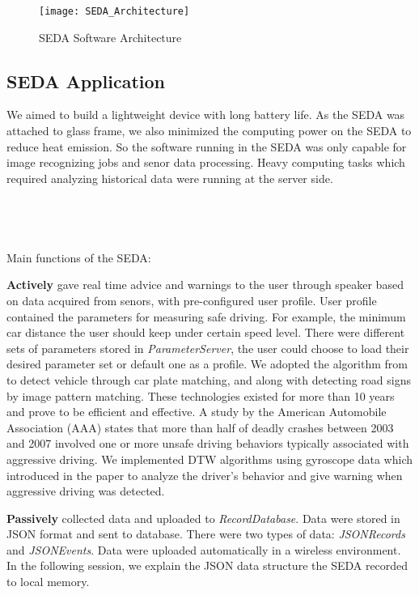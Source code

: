 \documentclass[main.tex]{subfiles}
\begin{document}
\begin{figure}
\caption{SEDA Software Architecture}
\centering
\texttt{[image: SEDA\_Architecture]}
\end{figure}

\subsection{SEDA Application}


We aimed to build a lightweight device with long battery life. As the SEDA was attached to glass frame, we also minimized the computing power on the SEDA to reduce heat emission. So the software running in the SEDA was only capable for image recognizing jobs and senor data processing. Heavy computing tasks which required analyzing historical data were running at the server side.
\\
\\
\\
\\
\\

Main functions of the SEDA:

\textbf{Actively} gave real time advice and warnings to the user through speaker based on data acquired from senors, with pre-configured user profile. User profile contained the parameters for measuring safe driving. For example, the minimum car distance the user should keep under certain speed level. There were different sets of parameters stored in \emph{ParameterServer}, the user could choose to load their desired parameter set or default one as a profile. We adopted the algorithm from \cite{fang2004automatic} to detect vehicle through car plate matching, and along with \cite{alom2007road} detecting road signs by image pattern matching. These technologies existed for more than 10 years and prove to be efficient and effective. A study by the American Automobile Association (AAA) states that more than half of deadly crashes between 2003 and 2007 involved one or more unsafe driving behaviors typically associated with aggressive driving. We implemented DTW algorithms using gyroscope data which introduced in the paper \cite{johnson2011driving} to analyze the driver's behavior and give warning when aggressive driving was detected.

\textbf{Passively} collected data and uploaded to \emph{RecordDatabase}. Data were stored in JSON format and sent to database. There were two types of data: \emph{JSONRecords} and \emph{JSONEvents}. Data were uploaded automatically in a wireless environment. In the following session, we explain the JSON data structure the SEDA recorded to local memory.
\end{document}
